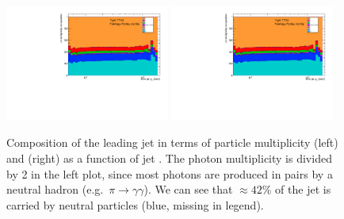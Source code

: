 \begin{figure}[b]
\centering
\includegraphics[width=0.48\textwidth,page=1]{figures/jet_comp_study_fixedGamma.pdf}
\includegraphics[width=0.48\textwidth,page=2]{figures/jet_comp_study_fixedGamma.pdf}%
\caption{Composition of the leading jet in terms of particle multiplicity (left) and \pt{} (right) as a function of jet \pt{}. The photon multiplicity is divided by 2 in the left plot, since most photons are produced in pairs by a neutral hadron (e.g.\ $\pi\to\gamma\gamma$).
We can see that $\approx 42$\% of the jet \pt{} is carried by neutral particles (blue, missing in legend).}
\label{fig:truthJetComp}
\end{figure}

